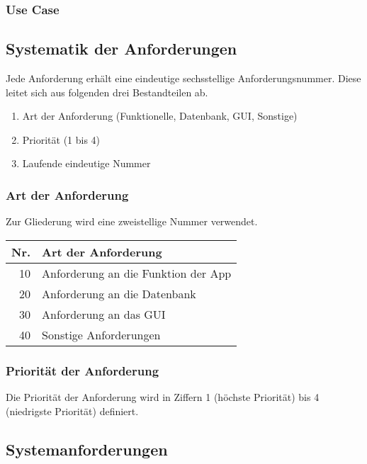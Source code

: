 \subsubsection{Use Case }

\subsection{Systematik der Anforderungen}

Jede Anforderung erhält eine eindeutige sechsstellige Anforderungsnummer. Diese leitet sich aus folgenden drei Bestandteilen ab.

\begin{enumerate}
	\item Art der Anforderung (Funktionelle, Datenbank, GUI, Sonstige)
	\item Priorität (1 bis 4)
	\item Laufende eindeutige Nummer
\end{enumerate} 

\subsubsection{Art der Anforderung}

Zur Gliederung wird eine zweistellige Nummer verwendet.

\begin{table} [htbp]
	\begin{tabular}{r|l}
		\textbf{Nr.} & \textbf{Art der Anforderung} \\ \hline
		10 & Anforderung an die Funktion der App \\
		\rowcolor{DarkSeaGreen} 20 & Anforderung an die Datenbank \\
		30 & Anforderung an das GUI \\
		\rowcolor{DarkSeaGreen} 40 & Sonstige Anforderungen
	\end{tabular}
\end{table}

\subsubsection{Priorität der Anforderung}

Die Priorität der Anforderung wird in Ziffern 1 (höchste Priorität) bis 4 (niedrigste Priorität) definiert.

\subsection{Systemanforderungen}